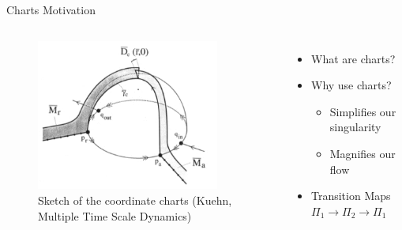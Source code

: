 \documentclass[11pt]{beamer}
\begin{document}
\begin{frame}{Charts Motivation}
    \begin{columns}
    \begin{figure}
        \centering
	\includegraphics[height=5cm,width=6cm]{Images/canard-ball}
        \caption{Sketch of the coordinate charts (Kuehn, Multiple Time Scale Dynamics)}
    \end{figure}    
        \begin{itemize}
            \item What are charts?
            \item Why use charts?
            \begin{itemize}
                \item Simplifies our singularity
                \item Magnifies our flow 
            \end{itemize}
            \item Transition Maps $\Pi_1\to \Pi_2\to \Pi_1$
        \end{itemize}

    \end{columns}
\end{frame}
\end{document}
